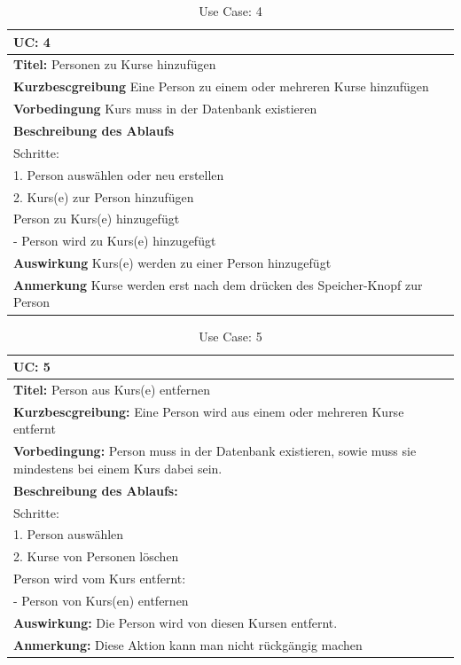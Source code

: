 %
%
\begin{table}[h]
\caption{Use Case: 4}
\begin{tabular}[ht]{|p{15cm}|}
  \hline
  \textbf{UC:} 4\\
  \hline
  \textbf{Titel:} Personen zu Kurse hinzufügen\\
  \hline
  \textbf{Kurzbescgreibung} Eine Person zu einem oder mehreren Kurse hinzufügen\\
  \hline
  \textbf{Vorbedingung} Kurs muss in der Datenbank existieren \\
  \hline
  \textbf{Beschreibung des Ablaufs}\\
Schritte:\\
1. Person auswählen oder neu erstellen\\
2. Kurs(e) zur Person hinzufügen\\
Person zu Kurs(e) hinzugefügt\\
- Person wird zu Kurs(e) hinzugefügt\\
  \hline
  \textbf{Auswirkung} Kurs(e) werden zu einer Person hinzugefügt\\
  \hline
  \textbf{Anmerkung} Kurse werden erst nach dem drücken des Speicher-Knopf zur Person\\
  \hline
\end{tabular}
\end{table}
%
%
\begin{table}[h]
\caption{Use Case: 5}
\begin{tabular}[ht]{|p{15cm}|}
  \hline
  \textbf{UC:} 5\\
  \hline
  \textbf{Titel:} Person aus Kurs(e) entfernen\\
  \hline
  \textbf{Kurzbescgreibung:} Eine Person wird aus einem oder mehreren Kurse entfernt\\
  \hline
  \textbf{Vorbedingung:}  Person muss in der Datenbank existieren, sowie muss sie
mindestens bei einem Kurs dabei sein.\\
  \hline
  \textbf{Beschreibung des Ablaufs:}\\
Schritte:\\
1. Person auswählen\\
2. Kurse von Personen löschen\\
Person wird vom Kurs entfernt:\\
- Person von Kurs(en) entfernen\\
  \hline
  \textbf{Auswirkung:} Die Person wird von diesen Kursen entfernt.\\
  \hline
  \textbf{Anmerkung:} Diese Aktion kann man nicht rückgängig machen\\
  \hline
\end{tabular}
\end{table}
